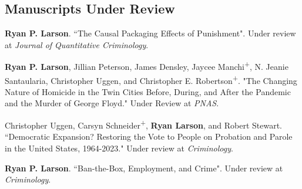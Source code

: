 \documentclass[letterpaper]{article}
\newenvironment{publist}{%
  \begin{list}{}{%
    \setlength{\leftmargin}{0cm}   %
    \setlength{\labelwidth}{2cm}     %
    \setlength{\labelsep}{0.5cm}     %
  }%
}{%
  \end{list}%
}
\begin{document}
\subsection*{Manuscripts Under Review}
\begin{publist}

\item \textbf{Ryan P. Larson}. ``The Causal Packaging Effects of Punishment". Under review at \textit{Journal of Quantitative Criminology}.

\item \textbf{Ryan P. Larson}, Jillian Peterson, James Densley, Jaycee Manchi\textsuperscript{+}, N. Jeanie Santaularia, Christopher Uggen, and Christopher E. Robertson\textsuperscript{+}. "The Changing Nature of Homicide in the Twin Cities Before, During, and After the Pandemic and the Murder of George Floyd." Under Review at \textit{PNAS}. 

\item Christopher Uggen, Carsyn Schneider\textsuperscript{+}, \textbf{Ryan Larson}, and Robert Stewart. ``Democratic Expansion? Restoring the Vote to People on Probation and Parole in the United States, 1964-2023." Under review at \textit{Criminology}.

\item \textbf{Ryan P. Larson}. ``Ban-the-Box, Employment, and Crime". Under review at \textit{Criminology}.

\end{publist}
\end{document}
